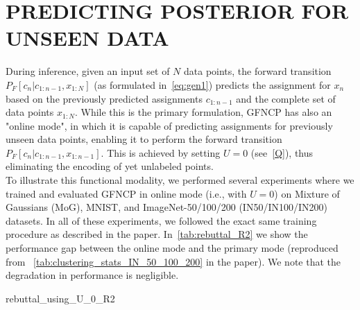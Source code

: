 
\section{PREDICTING POSTERIOR FOR UNSEEN DATA}
\label{sec:online_mode}

During inference, given an input set of $N$ data points, the forward transition $P_{F}[c_n|c_{1:n-1}, x_{1:N}]$ (as formulated in~\autoref{eq:gen1}) predicts the assignment for $x_n$ based on the previously predicted assignments $c_{1:n-1}$ and the complete set of data points $x_{1:N}$.
%
While this is the primary formulation, GFNCP has also an "online mode", in which it is capable of predicting assignments for previously unseen data points, enabling it to perform the forward transition $P_{F}[c_n|c_{1:n-1}, x_{1:n-1}]$. This is achieved by setting $U=0$ (see~\autoref{Q}), thus eliminating the encoding of yet unlabeled points.\\
%

To illustrate this functional modality, we performed several experiments where we trained and evaluated GFNCP in online mode (i.e., with $U=0$) on Mixture of Gaussians (MoG), MNIST, and ImageNet-50/100/200 (IN50/IN100/IN200) datasets. In all of these experiments, we followed the exact same training procedure as described in the paper. In~\autoref{tab:rebuttal_R2} we show the performance gap between the online mode and the primary mode (reproduced from ~\autoref{tab:clustering_stats_IN_50_100_200} in the paper). 
We note that the degradation in performance is negligible.

{rebuttal_using_U_0_R2}